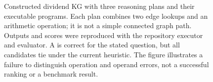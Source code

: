 \begin{figure}[t]

\caption{Constructed dividend KG with three reasoning plans and their executable
programs. Each plan combines two edge lookups and an arithmetic operation; it
is not a simple connected graph path. Outputs and scores were reproduced with
the repository executor and evaluator. A is correct for the stated question,
but all candidates tie under the current heuristic. The figure illustrates a
failure to distinguish operation and operand errors, not a successful ranking
or a benchmark result.}
\label{fig:kg-paths}
\end{figure}
